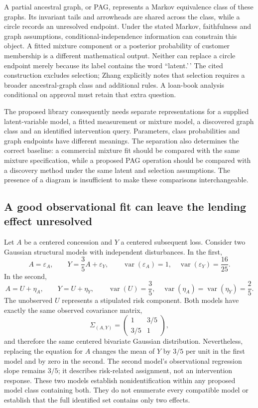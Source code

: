 A partial ancestral graph, or PAG, represents a Markov equivalence class
of these graphs. Its invariant tails and arrowheads are shared across
the class, while a circle records an unresolved endpoint. Under the
stated Markov, faithfulness and graph assumptions,
conditional-independence information can constrain this object. A fitted
mixture component or a posterior probability of customer membership is a
different mathematical output. Neither can replace a circle endpoint
merely because its label contains the word ``latent.'\,' The cited
construction excludes selection; Zhang explicitly notes that selection
requires a broader ancestral-graph class and additional rules. A
loan-book analysis conditional on approval must retain that extra
question. \citep[pp.1442--1445]{zhang2008}

The proposed library consequently needs separate representations for a
supplied latent-variable model, a fitted measurement or mixture model, a
discovered graph class and an identified intervention query. Parameters,
class probabilities and graph endpoints have different meanings. The
separation also determines the correct baseline: a commercial mixture
fit should be compared with the same mixture specification, while a
proposed PAG operation should be compared with a discovery method under
the same latent and selection assumptions. The presence of a diagram is
insufficient to make these comparisons interchangeable.

\hypertarget{a-good-observational-fit-can-leave-the-lending-effect-unresolved}{%
\subsection{A good observational fit can leave the lending effect
unresolved}\label{a-good-observational-fit-can-leave-the-lending-effect-unresolved}}

Let \(A\) be a centered concession and \(Y\) a centered subsequent loss.
Consider two Gaussian structural models with independent disturbances.
In the first, \[
 A=\varepsilon_A,\qquad
 Y=\frac35 A+\varepsilon_Y,\qquad
 \operatorname{var}(\varepsilon_A)=1,\quad
 \operatorname{var}(\varepsilon_Y)=\frac{16}{25}.
\] In the second, \[
 A=U+\eta_A,\qquad Y=U+\eta_Y,\qquad
 \operatorname{var}(U)=\frac35,\quad
 \operatorname{var}(\eta_A)=\operatorname{var}(\eta_Y)=\frac25.
\] The unobserved \(U\) represents a stipulated risk component. Both
models have exactly the same observed covariance matrix, \[
 \Sigma_{(A,Y)}=
 \begin{pmatrix}1&3/5\\3/5&1\end{pmatrix},
\] and therefore the same centered bivariate Gaussian distribution.
Nevertheless, replacing the equation for \(A\) changes the mean of \(Y\)
by \(3/5\) per unit in the first model and by zero in the second. The
second model's observational regression slope remains \(3/5\); it
describes risk-related assignment, not an intervention response. These
two models establish nonidentification within any proposed model class
containing both. They do not enumerate every compatible model or
establish that the full identified set contains only two effects.
\citep{exec13_latent_examples}

